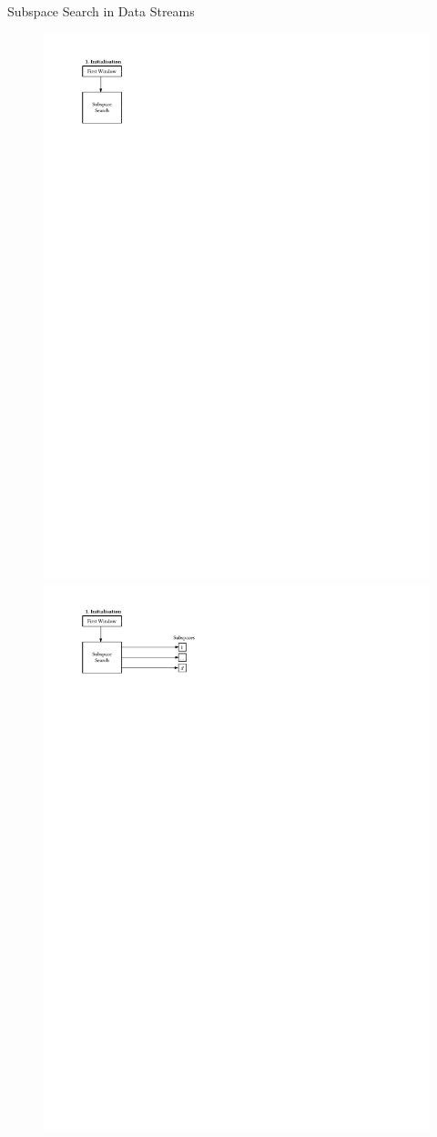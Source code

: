 \documentclass[16pt,usenames,dvipsnames, notheorems]{beamer}
\theoremstyle{definition}
\theoremstyle{example}
\theoremstyle{plain}
\begin{document}
\begin{frame}{Subspace Search in Data Streams}
\begin{figure}
\begin{overprint}
		\includegraphics[width=0.9\linewidth]{figures/SGMRD_workflow_5-compressed.pdf}
		\onslide<3>
		\includegraphics[width=0.9\linewidth]{figures/SGMRD_workflow_4-compressed.pdf}

\end{overprint}
\end{figure}
\end{frame}
\end{document}
